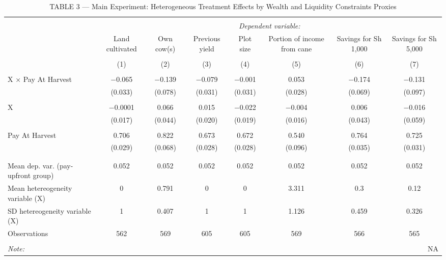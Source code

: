 
\begin{table}[!htbp] \centering 
  \caption{TABLE 3 — Main Experiment: Heterogeneous Treatment Effects by Wealth and Liquidity Constraints Proxies} 
  \label{} 
\begin{tabular}{@{\extracolsep{5pt}}lccccccc} 
\\[-1.8ex]\hline 
\hline \\[-1.8ex] 
 & \multicolumn{7}{c}{\textit{Dependent variable:}} \\ 
\cline{2-8} 
 & Land cultivated & Own cow(s) & Previous yield & Plot size & Portion of income from cane & Savings for Sh 1,000 & Savings for Sh 5,000 \\ 
\\[-1.8ex] & (1) & (2) & (3) & (4) & (5) & (6) & (7)\\ 
\hline \\[-1.8ex] 
 X × Pay At Harvest & $-$0.065 & $-$0.139 & $-$0.079 & $-$0.001 & 0.053 & $-$0.174 & $-$0.131 \\ 
  & (0.033) & (0.078) & (0.031) & (0.031) & (0.028) & (0.069) & (0.097) \\ 
  & & & & & & & \\ 
 X & $-$0.0001 & 0.066 & 0.015 & $-$0.022 & $-$0.004 & 0.006 & $-$0.016 \\ 
  & (0.017) & (0.044) & (0.020) & (0.019) & (0.016) & (0.043) & (0.059) \\ 
  & & & & & & & \\ 
 Pay At Harvest & 0.706 & 0.822 & 0.673 & 0.672 & 0.540 & 0.764 & 0.725 \\ 
  & (0.029) & (0.068) & (0.028) & (0.028) & (0.096) & (0.035) & (0.031) \\ 
  & & & & & & & \\ 
\hline \\[-1.8ex] 
Mean dep. var. (pay-upfront group) & 0.052 & 0.052 & 0.052 & 0.052 & 0.052 & 0.052 & 0.052 \\ 
Mean hetereogeneity variable (X) & 0 & 0.791 & 0 & 0 & 3.311 & 0.3 & 0.12 \\ 
SD hetereogeneity variable (X) & 1 & 0.407 & 1 & 1 & 1.126 & 0.459 & 0.326 \\ 
Observations & 562 & 569 & 605 & 605 & 569 & 566 & 565 \\ 
\hline 
\hline \\[-1.8ex] 
\textit{Note:}  & \multicolumn{7}{r}{NA} \\ 
\end{tabular} 
\end{table} 
